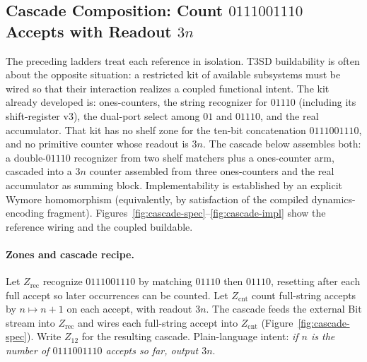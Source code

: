 \subsection{Cascade Composition: Count \texorpdfstring{$0111001110$}{0111001110} Accepts with Readout \texorpdfstring{$3n$}{3n}}
\label{sec:case-compose}

The preceding ladders treat each reference in isolation. T3SD buildability is often about the opposite situation: a restricted kit of available subsystems must be wired so that their interaction realizes a coupled functional intent. The kit already developed is: ones-counters, the string recognizer for $01110$ (including its shift-register v3), the dual-port select among $01$ and $01110$, and the real accumulator. That kit has no shelf zone for the ten-bit concatenation $0111001110$, and no primitive counter whose readout is $3n$. The cascade below assembles both: a double-$01110$ recognizer from two shelf matchers plus a ones-counter arm, cascaded into a $3n$ counter assembled from three ones-counters and the real accumulator as summing block. Implementability is established by an explicit Wymore homomorphism (equivalently, by satisfaction of the compiled dynamics-encoding fragment). Figures~\ref{fig:cascade-spec}--\ref{fig:cascade-impl} show the reference wiring and the coupled buildable.

\paragraph{Zones and cascade recipe.}
Let $Z_{\mathrm{rec}}$ recognize $0111001110$ by matching $01110$ then $01110$, resetting after each full accept so later occurrences can be counted. Let $Z_{\mathrm{cnt}}$ count full-string accepts by $n\mapsto n{+}1$ on each accept, with readout $3n$. The cascade feeds the external Bit stream into $Z_{\mathrm{rec}}$ and wires each full-string accept into $Z_{\mathrm{cnt}}$ (Figure~\ref{fig:cascade-spec}). Write $Z_{12}$ for the resulting cascade. Plain-language intent: \emph{if $n$ is the number of $0111001110$ accepts so far, output $3n$}.

